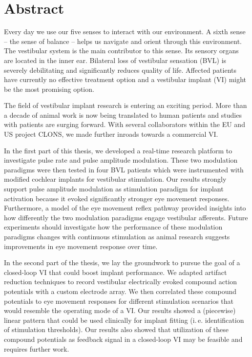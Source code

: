 \begingroup
\let\clearpage\relax
\let\cleardoublepage\relax
\let\cleardoublepage\relax

\chapter*{Abstract}
Every day we use our five senses to interact with our environment. A sixth sense -- the sense of balance  -- helps us navigate and orient through this environment. The vestibular system is the main contributor to this sense. Its sensory organs are located in the inner ear. Bilateral loss of vestibular sensation (BVL) is severely debilitating and significantly reduces quality of life. Affected patients have currently no effective treatment option and a vestibular implant (VI) might be the most promising option.

The field of vestibular implant research is entering an exciting period. More than a decade of animal work is now being translated to human patients and studies with patients are surging forward. With several collaborators within the EU and US project CLONS, we made further inroads towards a commercial VI. 

In the first part of this thesis, we developed a real-time research platform to investigate pulse rate and pulse amplitude modulation. These two modulation paradigms were then tested in four BVL patients which were instrumented with modified cochlear implants for vestibular stimulation. Our results strongly support pulse amplitude modulation as stimulation paradigm for implant activation because it evoked significantly stronger eye movement responses. Furthermore, a model of the eye movement reflex pathway provided insights into how differently the two modulation paradigms engage vestibular afferents. Future experiments should investigate how the performance of these modulation paradigms changes with continuous stimulation as animal research suggests improvements in eye movement response over time.

In the second part of the thesis, we lay the groundwork to pursue the goal of a closed-loop VI that could boost implant performance. We adapted artifact reduction techniques to record vestibular electrically evoked compound action potentials with a custom electrode array. We then correlated these compound potentials to eye movement responses for different stimulation scenarios that would resemble the operating mode of a VI. Our results showed a (piecewise) linear pattern that could be used clinically for implant fitting (i.\,e. identification of stimulation thresholds). Our results also showed that utilization of these compound potentials as feedback signal in a closed-loop VI may be feasible and requires further work.  

